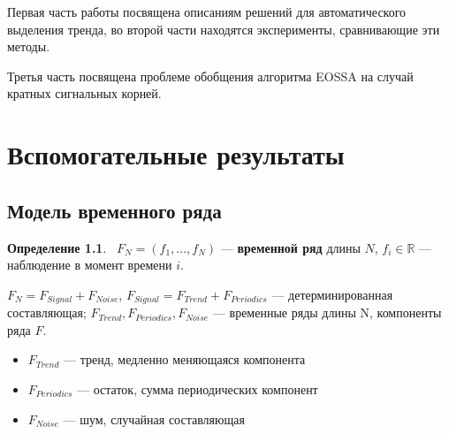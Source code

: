 \documentclass[specialist, substylefile = spbureport.rtx, subf,href,colorlinks=true, 12pt]{disser}
\theoremstyle{definition}
\newtheorem{definition}{Определение}
\begin{document}
Первая часть работы посвящена описаниям решений для автоматического выделения тренда, во второй части находятся эксперименты, сравнивающие эти методы.

Третья часть посвящена проблеме обобщения алгоритма EOSSA на случай кратных сигнальных корней.

\chapter{Вспомогательные результаты}
\label{ch:1}
\section{Модель временного ряда}
\begin{definition}
    ~$F_N = (f_1, \ldots, f_N)$ --- \textbf{временной ряд} длины $N$, $f_i \in \mathbb{R}$ --- наблюдение в момент времени $i$.
    
    $F_N = F_{Signal} + F_{Noise}$, $F_{Signal} = F_{Trend} + F_{Periodics}$ --- детерминированная составляющая; $F_{Trend}, F_{Periodics}, F_{Noise}$ --- временные ряды длины N, компоненты ряда $F$.
    \begin{itemize}
        \item $F_{Trend}$ --- тренд, медленно меняющаяся компонента
        \item $F_{Periodics}$ --- остаток, сумма периодических компонент
        \item $F_{Noise}$ --- шум, случайная составляющая
    \end{itemize}
\end{definition}
\end{document}
